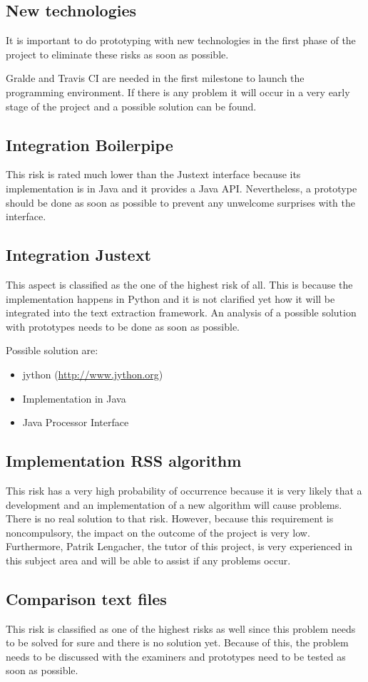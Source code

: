 \subsection{New technologies}

It is important to do prototyping with new technologies in the first phase of the project to eliminate these risks as soon as possible.

Gralde and Travis CI are needed in the first milestone to launch the programming environment. If there is any problem it will occur in a very early stage of the project and a possible solution can be found.

\subsection{Integration Boilerpipe}

This risk is rated much lower than the Justext interface because its implementation is in Java and it provides a Java API. Nevertheless, a prototype should be done as soon as possible to prevent any unwelcome surprises with the interface.

\subsection{Integration Justext}
\label{subsec:Integration Justext}

This aspect is classified as the one of the highest risk of all. This is because the implementation happens in Python and it is not clarified yet how it will be integrated into the text extraction framework. An analysis of a possible solution with prototypes needs to be done as soon as possible.

Possible solution are:
\begin{itemize}
\item jython (\url{http://www.jython.org})
\item Implementation in Java
\item Java Processor Interface 
\end{itemize}


\subsection{Implementation RSS algorithm}

This risk has a very high probability of occurrence because it is very likely that a development and an implementation of a new algorithm will cause problems. There is no real solution to that risk. However, because this requirement is noncompulsory, the impact on the outcome of the project is very low. Furthermore, Patrik Lengacher, the tutor of this project, is very experienced in this subject area and will be able to assist if any problems occur.

\subsection{Comparison text files}
This risk is classified as one of the highest risks as well since this problem needs to be solved for sure and there is no solution yet. Because of this, the problem needs to be discussed with the examiners and prototypes need to be tested as soon as possible.